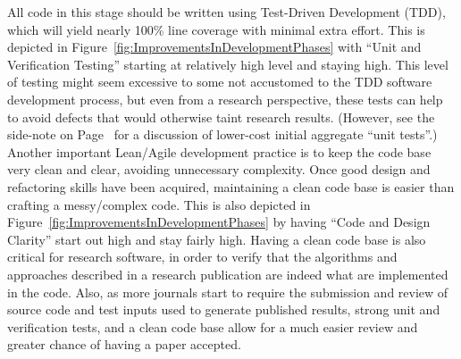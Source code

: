 \documentclass[11pt]{SANDreport}
\begin{document}
All code in this stage should be written using Test-Driven Development (TDD), which will yield nearly 100\% line coverage with minimal extra effort.  This is depicted in Figure~\ref{fig:ImprovementsInDevelopmentPhases} with ``Unit and Verification Testing'' starting at relatively high level and staying high.  This level of testing might seem excessive to some not accustomed to the TDD software development process, but even from a research perspective, these tests can help to avoid defects that would otherwise taint research results.  (However, see the side-note on Page~\pageref{levels_of_unit_testing} for a discussion of lower-cost initial aggregate ``unit tests''.)  Another important Lean/Agile development practice is to keep the code base very clean and clear, avoiding unnecessary complexity.  Once good design and refactoring skills have been acquired, maintaining a clean code base is easier than crafting a messy/complex code.  This is also depicted in Figure~\ref{fig:ImprovementsInDevelopmentPhases} by having ``Code and Design Clarity'' start out high and stay fairly high.  Having a clean code base is also critical for research software, in order to verify that the algorithms and approaches described in a research publication are indeed what are implemented in the code.  Also, as more journals start to require the submission and review of source code and test inputs used to generate published results, strong unit and verification tests, and a clean code base allow for a much easier review and greater chance of having a paper accepted.
\end{document}
